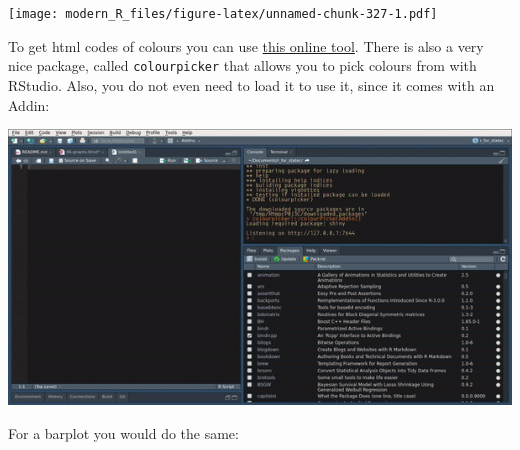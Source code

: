 \documentclass[]{gitbook}
\newenvironment{Shaded}{\begin{snugshade}}{\end{snugshade}}
\newcommand{\DataTypeTok}[1]{\textcolor[rgb]{0.13,0.29,0.53}{#1}}
\newcommand{\FloatTok}[1]{\textcolor[rgb]{0.00,0.00,0.81}{#1}}
\newcommand{\KeywordTok}[1]{\textcolor[rgb]{0.13,0.29,0.53}{\textbf{#1}}}
\newcommand{\NormalTok}[1]{#1}
\newcommand{\OperatorTok}[1]{\textcolor[rgb]{0.81,0.36,0.00}{\textbf{#1}}}
\newcommand{\StringTok}[1]{\textcolor[rgb]{0.31,0.60,0.02}{#1}}
\theoremstyle{definition}
\theoremstyle{definition}
\theoremstyle{definition}
\theoremstyle{remark}
\begin{document}
\texttt{[image: modern\_R\_files/figure-latex/unnamed-chunk-327-1.pdf]}

To get html codes of colours you can use
\href{http://htmlcolorcodes.com/color-picker/}{this online tool}. There
is also a very nice package, called \texttt{colourpicker} that allows
you to pick colours from with RStudio. Also, you do not even need to
load it to use it, since it comes with an Addin:

\includegraphics{pics/rstudio_colourpicker.gif}

For a barplot you would do the same:

\begin{Shaded}
\end{Shaded}
\end{document}

